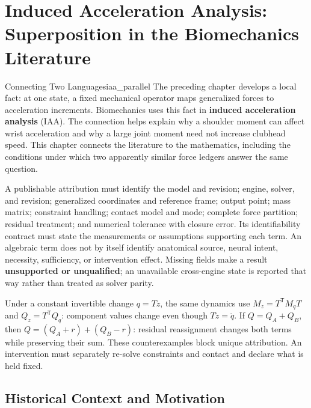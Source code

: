 \chapter{Induced Acceleration Analysis: Superposition in the Biomechanics Literature}
\label{ch:iaa_biomechanics}

\begin{laymansbox}{Connecting Two Languages}{iaa_parallel}
The preceding chapter develops a local fact: at one state, a fixed mechanical operator maps generalized forces to acceleration increments. Biomechanics uses this fact in \textbf{induced acceleration analysis} (IAA). The connection helps explain why a shoulder moment can affect wrist acceleration and why a large joint moment need not increase clubhead speed. This chapter connects the literature to the mathematics, including the conditions under which two apparently similar force ledgers answer the same question.
\end{laymansbox}

\begin{axiombox}
A publishable attribution must identify the model and revision; engine, solver, and revision; generalized coordinates and reference frame; output point; mass matrix; constraint handling; contact model and mode; complete force partition; residual treatment; and numerical tolerance with closure error. Its identifiability contract must state the measurements or assumptions supporting each term. An algebraic term does not by itself identify anatomical source, neural intent, necessity, sufficiency, or intervention effect. Missing fields make a result \textbf{unsupported or unqualified}; an unavailable cross-engine state is reported that way rather than treated as solver parity.

Under a constant invertible change $q=Tz$, the same dynamics use $M_z=T^\mathsf{T}M_qT$ and $Q_z=T^\mathsf{T}Q_q$: component values change even though $T\ddot z=\ddot q$. If $Q=Q_A+Q_B$, then $Q=(Q_A+r)+(Q_B-r)$: residual reassignment changes both terms while preserving their sum. These counterexamples block unique attribution. An intervention must separately re-solve constraints and contact and declare what is held fixed.
\end{axiombox}

\section{Historical Context and Motivation}
\label{sec:iaa_history}

